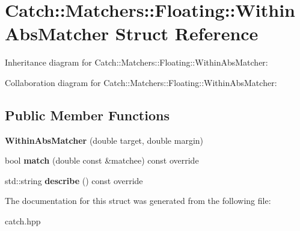 \hypertarget{structCatch_1_1Matchers_1_1Floating_1_1WithinAbsMatcher}{}\section{Catch\+:\+:Matchers\+:\+:Floating\+:\+:Within\+Abs\+Matcher Struct Reference}
\label{structCatch_1_1Matchers_1_1Floating_1_1WithinAbsMatcher}


Inheritance diagram for Catch\+:\+:Matchers\+:\+:Floating\+:\+:Within\+Abs\+Matcher\+:


Collaboration diagram for Catch\+:\+:Matchers\+:\+:Floating\+:\+:Within\+Abs\+Matcher\+:
\subsection*{Public Member Functions}
\begin{DoxyCompactItemize}
\item 
{\bfseries Within\+Abs\+Matcher} (double target, double margin)\hypertarget{structCatch_1_1Matchers_1_1Floating_1_1WithinAbsMatcher_ac45340b98c41230a7def5bd86c2d870f}{}\label{structCatch_1_1Matchers_1_1Floating_1_1WithinAbsMatcher_ac45340b98c41230a7def5bd86c2d870f}

\item 
bool {\bfseries match} (double const \&matchee) const override\hypertarget{structCatch_1_1Matchers_1_1Floating_1_1WithinAbsMatcher_afa5d8eed57f12c1e5d006471eb0bfe72}{}\label{structCatch_1_1Matchers_1_1Floating_1_1WithinAbsMatcher_afa5d8eed57f12c1e5d006471eb0bfe72}

\item 
std\+::string {\bfseries describe} () const override\hypertarget{structCatch_1_1Matchers_1_1Floating_1_1WithinAbsMatcher_a206a738680f8767af31d3f1835afff3f}{}\label{structCatch_1_1Matchers_1_1Floating_1_1WithinAbsMatcher_a206a738680f8767af31d3f1835afff3f}

\end{DoxyCompactItemize}


The documentation for this struct was generated from the following file\+:\begin{DoxyCompactItemize}
\item 
catch.\+hpp\end{DoxyCompactItemize}
